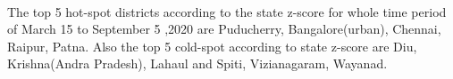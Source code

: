 \documentclass[paper=a4, fontsize=11pt]{scrartcl}
\numberwithin{equation}{section}		%
\numberwithin{figure}{section}			%
\numberwithin{table}{section}				%
\begin{document}
\paragraph{}
The top 5 hot-spot districts according to the state z-score for whole time period of March 15 to September 5 ,2020 are Puducherry, Bangalore(urban), Chennai, Raipur, Patna. Also the top 5 cold-spot according to state z-score are Diu, Krishna(Andra Pradesh), Lahaul and Spiti, Vizianagaram, Wayanad.

\end{document}
